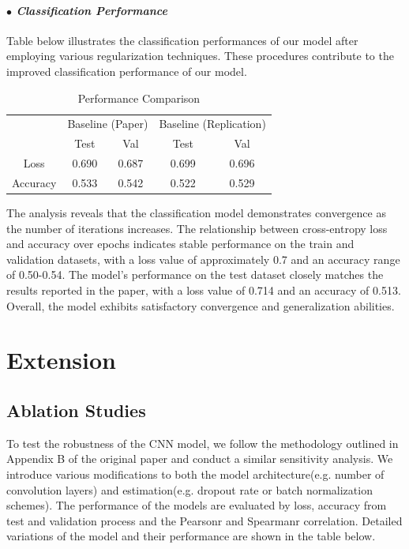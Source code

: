 \documentclass{article}
\begin{document}
\paragraph{$\bullet$ \emph {Classification Performance}}
Table below illustrates the classification performances of our model after employing various regularization techniques. These procedures contribute to the improved classification performance of our model. 

\begin{table}[H]
  \centering
  \caption{Performance Comparison}
  \begin{tabular}{ccccc}
    \toprule
    & \multicolumn{2}{c}{Baseline (Paper)} & \multicolumn{2}{c}{Baseline (Replication)} \\
    \cmidrule(lr){2-3} \cmidrule(lr){4-5}
    & Test & Val & Test & Val \\
    \midrule
    Loss & 0.690 & 0.687 & 0.699 & 0.696 \\
    Accuracy & 0.533 & 0.542 & 0.522 & 0.529 \\
    \bottomrule
  \end{tabular}
\end{table}


The analysis reveals that the classification model demonstrates convergence as the number of iterations increases. The relationship between cross-entropy loss and accuracy over epochs indicates stable performance on the train and validation datasets, with a loss value of approximately 0.7 and an accuracy range of 0.50-0.54. The model's performance on the test dataset closely matches the results reported in the paper, with a loss value of 0.714 and an accuracy of 0.513. Overall, the model exhibits satisfactory convergence and generalization abilities.


\section{Extension}

\subsection{Ablation Studies}
To test the robustness of the CNN model, we follow the methodology outlined in Appendix B of the original paper and conduct a similar sensitivity analysis. We introduce various modifications to both the model architecture(e.g. number of convolution layers) and estimation(e.g. dropout rate or batch normalization schemes). The performance of the models are evaluated by loss, accuracy from test and validation process and the Pearsonr and Spearmanr correlation. Detailed variations of the model and their performance are shown in the table below.
\end{document}
